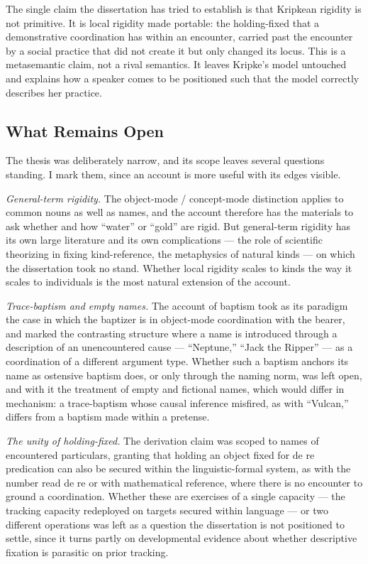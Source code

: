 \documentclass[12pt,a4paper]{article}
\begin{document}
The single claim the dissertation has tried to establish is that Kripkean rigidity is not primitive. It is local rigidity made portable: the holding-fixed that a demonstrative coordination has within an encounter, carried past the encounter by a social practice that did not create it but only changed its locus. This is a metasemantic claim, not a rival semantics. It leaves Kripke's model untouched and explains how a speaker comes to be positioned such that the model correctly describes her practice.

\subsection{What Remains Open}\label{what-remains-open}

The thesis was deliberately narrow, and its scope leaves several questions standing. I mark them, since an account is more useful with its edges visible.

\emph{General-term rigidity.} The object-mode / concept-mode distinction applies to common nouns as well as names, and the account therefore has the materials to ask whether and how ``water'' or ``gold'' are rigid. But general-term rigidity has its own large literature and its own complications --- the role of scientific theorizing in fixing kind-reference, the metaphysics of natural kinds --- on which the dissertation took no stand. Whether local rigidity scales to kinds the way it scales to individuals is the most natural extension of the account.

\emph{Trace-baptism and empty names.} The account of baptism took as its paradigm the case in which the baptizer is in object-mode coordination with the bearer, and marked the contrasting structure where a name is introduced through a description of an unencountered cause --- ``Neptune,'' ``Jack the Ripper'' --- as a coordination of a different argument type. Whether such a baptism anchors its name as ostensive baptism does, or only through the naming norm, was left open, and with it the treatment of empty and fictional names, which would differ in mechanism: a trace-baptism whose causal inference misfired, as with ``Vulcan,'' differs from a baptism made within a pretense.

\emph{The unity of holding-fixed.} The derivation claim was scoped to names of encountered particulars, granting that holding an object fixed for de re predication can also be secured within the linguistic-formal system, as with the number read de re or with mathematical reference, where there is no encounter to ground a coordination. Whether these are exercises of a single capacity --- the tracking capacity redeployed on targets secured within language --- or two different operations was left as a question the dissertation is not positioned to settle, since it turns partly on developmental evidence about whether descriptive fixation is parasitic on prior tracking.
\end{document}
